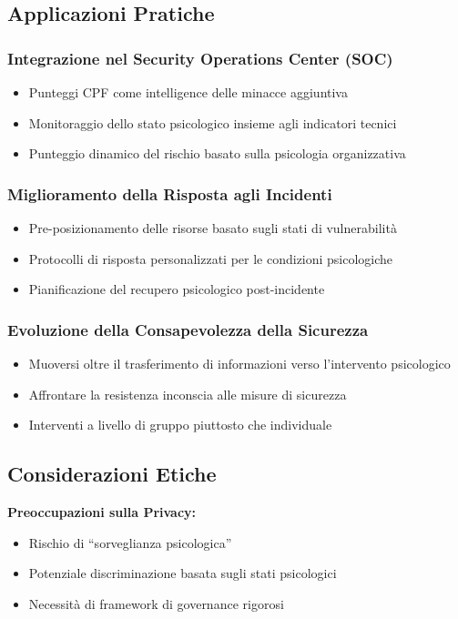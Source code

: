 \documentclass[11pt,a4paper]{article}
\begin{document}
\subsection{Applicazioni Pratiche}

\subsubsection{Integrazione nel Security Operations Center (SOC)}
\begin{itemize}
\item Punteggi CPF come intelligence delle minacce aggiuntiva
\item Monitoraggio dello stato psicologico insieme agli indicatori tecnici
\item Punteggio dinamico del rischio basato sulla psicologia organizzativa
\end{itemize}

\subsubsection{Miglioramento della Risposta agli Incidenti}
\begin{itemize}
\item Pre-posizionamento delle risorse basato sugli stati di vulnerabilità
\item Protocolli di risposta personalizzati per le condizioni psicologiche
\item Pianificazione del recupero psicologico post-incidente
\end{itemize}

\subsubsection{Evoluzione della Consapevolezza della Sicurezza}
\begin{itemize}
\item Muoversi oltre il trasferimento di informazioni verso l'intervento psicologico
\item Affrontare la resistenza inconscia alle misure di sicurezza
\item Interventi a livello di gruppo piuttosto che individuale
\end{itemize}

\subsection{Considerazioni Etiche}

\textbf{Preoccupazioni sulla Privacy:}
\begin{itemize}
\item Rischio di ``sorveglianza psicologica''
\item Potenziale discriminazione basata sugli stati psicologici
\item Necessità di framework di governance rigorosi
\end{itemize}
\end{document}
